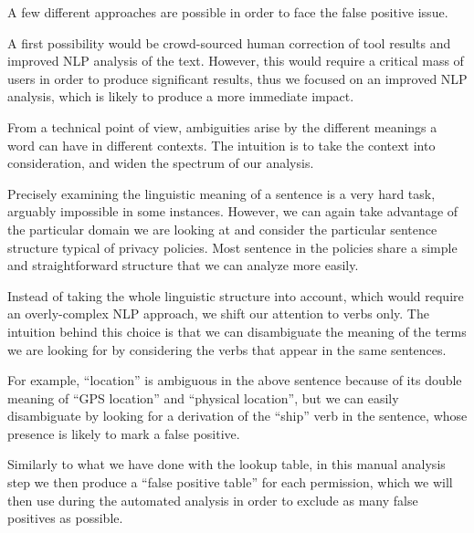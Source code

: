 A few different approaches are possible in order to face the false positive issue.

A first possibility would be crowd-sourced human correction of tool results and improved NLP analysis of the text.
However, this would require a critical mass of users in order to produce significant results, thus we focused on an improved NLP analysis, which is likely to produce a more immediate impact.

From a technical point of view, ambiguities arise by the different meanings a word can have in different contexts. The intuition is to take the context into consideration, and widen the spectrum of our analysis.

Precisely examining the linguistic meaning of a sentence is a very hard task, arguably impossible in some instances. However, we can again take advantage of the particular domain we are looking at and consider the particular sentence structure typical of privacy policies.
Most sentence in the policies share a simple and straightforward structure that we can analyze more easily.

Instead of taking the whole linguistic structure into account, which would require an overly-complex NLP approach, we shift our attention to verbs only. The intuition behind this choice is that we can disambiguate the meaning of the terms we are looking for by considering the verbs that appear in the same sentences.

For example, ``location'' is ambiguous in the above sentence because of its double meaning of ``GPS location'' and ``physical location'', but we can easily disambiguate by looking for a derivation of the ``ship'' verb in the sentence, whose presence is likely to mark a false positive.

Similarly to what we have done with the lookup table, in this manual analysis step we then produce a ``false positive table'' for each permission, which we will then use during the automated analysis in order to exclude as many false positives as possible.